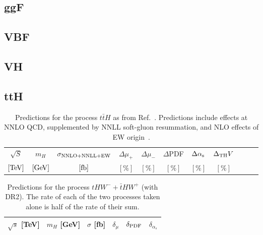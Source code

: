 \subsection{ggF}

\subsection{VBF}

\subsection{VH}

\subsection{ttH}


\begin{table}
    \centering
    \begin{tabular}{ccccccccccc}
        $\sqrt{S}$  &  $m_H$  &  $\sigma_{\rm NNLO+NNLL+EW}$  &
          $\Delta\mu_+$  &  $\Delta\mu_-$  &  $\Delta$PDF  &  $\Delta\alpha_{\mathrm{s}}$  &  $\Delta_{\rm TH}V$\\
        $[\rm TeV]$  &  $[\rm GeV]$  &  $[\rm fb]$  &  $[\%]$   &  $[\%]$   &  $[\%]$   &  $[\%]$   &  $[\%]$ \\
        \hline \hline
        
    \end{tabular}
    \caption{\label{tab:tth-tot} Predictions for the process $t\bar tH$ as from Ref.~\cite{Balsach:2025jcw}. Predictions include effects at
NNLO QCD, supplemented by NNLL soft-gluon resummation, and NLO effects of EW origin~\cite{Frixione:2014qaa,Frixione:2015zaa,Kulesza:2015vda,Broggio:2015lya,Broggio:2016lfj,
Kulesza:2017ukk,Frederix:2018nkq,Kulesza:2018tqz,Broggio:2019ewu,Kulesza:2020nfh,
Catani:2022mfv,Devoto:2024nhl}.} 
\end{table}


\begin{table}
    \centering
    \begin{tabular}{cccccc}
        $\sqrt{s}$ [TeV]  &  $m_H$ [GeV]  &  $\sigma$ [fb]  & $\delta_{\mu}$   &  $\delta_{\rm PDF}$   & $\delta_{\alpha_s}$\\
        \hline
          
    \end{tabular}
    \caption{\label{tab:thw-tot} Predictions for the process $tHW^- + \bar t HW^+$ (with DR2). The rate of each of the two processes taken alone is
half of the rate of their sum.}
\end{table}

